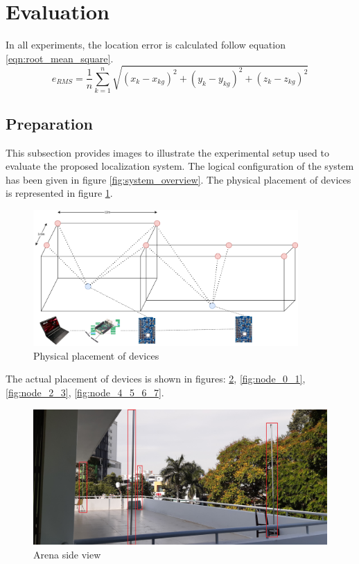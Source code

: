 \documentclass[\main/main.tex]{subfiles}
\begin{document}
\section{Evaluation}

In all experiments, the location error is calculated follow equation \ref{eqn:root_mean_square}.
\begin{equation}
    e_{RMS} = \frac{1}{n} \sum_{k=1}^{n} \sqrt{(x_k-x_{kg})^2 + (y_k-y_{kg})^2 + (z_k-z_{kg})^2}
    \label{eqn:root_mean_square}
\end{equation}

\subsection{Preparation}
This subsection provides images to illustrate the experimental setup used to evaluate the proposed localization system. The logical configuration of the system has been given in figure \ref{fig:system_overview}. The physical placement of devices is represented in figure \ref{fig:physical placement of devices}.

\begin{figure}[H]     
    \centering
    \includegraphics[width=0.9\textwidth]{system_overview_phy.png}
    \caption{Physical placement of devices}
    \label{fig:physical placement of devices}
\end{figure}
The actual placement of devices is shown in figures: \ref{fig:arena_00}, \ref{fig:node_0_1}, \ref{fig:node_2_3}, \ref{fig:node_4_5_6_7}.

\begin{figure}[H]      
    \centering
    \includegraphics[width=1\textwidth]{arena_00.jpg}
    \caption{Arena side view}
    \label{fig:arena_00}
\end{figure}
\end{document}
